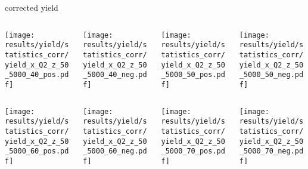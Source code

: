 \begin{frame}{corrected yield}
\begin{columns}
\begin{column}[T]{0.25\textwidth}
\texttt{[image: results/yield/statistics\_corr/yield\_x\_Q2\_z\_50\_5000\_40\_pos.pdf]}
\end{column}
\begin{column}[T]{0.25\textwidth}
\texttt{[image: results/yield/statistics\_corr/yield\_x\_Q2\_z\_50\_5000\_40\_neg.pdf]}
\end{column}
\begin{column}[T]{0.25\textwidth}
\texttt{[image: results/yield/statistics\_corr/yield\_x\_Q2\_z\_50\_5000\_50\_pos.pdf]}
\end{column}
\begin{column}[T]{0.25\textwidth}
\texttt{[image: results/yield/statistics\_corr/yield\_x\_Q2\_z\_50\_5000\_50\_neg.pdf]}
\end{column}
\end{columns}
\begin{columns}
\begin{column}[T]{0.25\textwidth}
\texttt{[image: results/yield/statistics\_corr/yield\_x\_Q2\_z\_50\_5000\_60\_pos.pdf]}
\end{column}
\begin{column}[T]{0.25\textwidth}
\texttt{[image: results/yield/statistics\_corr/yield\_x\_Q2\_z\_50\_5000\_60\_neg.pdf]}
\end{column}
\begin{column}[T]{0.25\textwidth}
\texttt{[image: results/yield/statistics\_corr/yield\_x\_Q2\_z\_50\_5000\_70\_pos.pdf]}
\end{column}
\begin{column}[T]{0.25\textwidth}
\texttt{[image: results/yield/statistics\_corr/yield\_x\_Q2\_z\_50\_5000\_70\_neg.pdf]}
\end{column}
\end{columns}
\end{frame}
